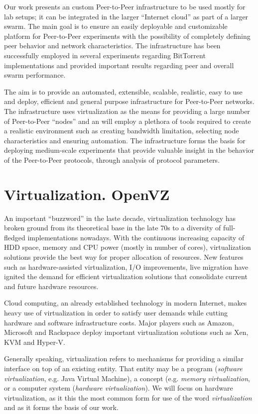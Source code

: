 Our work presents an custom Peer-to-Peer infrastructure to be used mostly for
lab setups; it can be integrated in the larger ``Internet cloud'' as part of a
larger swarm. The main goal is to ensure an easily deployable and customizable
platform for Peer-to-Peer experiments with the possibility of completely
defining peer behavior and network characteristics. The infrastructure has
been successfully employed in several experiments regarding BitTorrent
implementations and provided important results regarding peer and overall
swarm performance.

The aim is to provide an automated, extensible, scalable, realistic, easy to
use and deploy, efficient and general purpose infrastructure for Peer-to-Peer
networks. The infrastructure uses virtualization as the means for
providing a large number of Peer-to-Peer ``nodes'' and an will employ a
plethora of tools required to create a realistic environment such as creating
bandwidth limitation, selecting node characteristics and ensuring automation.
The infrastructure forms the basis for deploying medium-scale experiments that
provide valuable insight in the behavior of the Peer-to-Peer protocols,
through analysis of protocol parameters.

\section{Virtualization. OpenVZ}
\label{sec:virt-infra:openvz}

An important ``buzzword'' in the laste decade, virtualization technology has
broken ground from its theoretical base in the late 70s to a diversity of
full-fledged implementations nowadays. With the continuous increasing capacity
of HDD space, memory and CPU power (mostly in number of cores), virtualization
solutions provide the best way for proper allocation of resources. New
features such as hardware-assisted virtualization, I/O improvements, live
migration have ignited the demand for efficient virtualization solutions that
consolidate current and future hardware resources.

Cloud computing, an already established technology in modern Internet, makes
heavy use of virtualization in order to satisfy user demands while cutting
hardware and software infrastructure costs. Major players such as Amazon,
Microsoft and Rackspace deploy important virtualization solutions such as Xen,
KVM and Hyper-V.

Generally speaking, virtualization refers to mechanisms for providing a
similar interface on top of an existing entity. That entity may be a program
(\textit{software virtualization}, e.g. {Java Virtual Machine}),
a concept (e.g. \textit{memory virtualization}, or a computer system
(\textit{hardware virtualization}). We will focus on hardware virtualization,
as it this the most common form for use of the word \textit{virtualization}
and as it forms the basis of our work.

